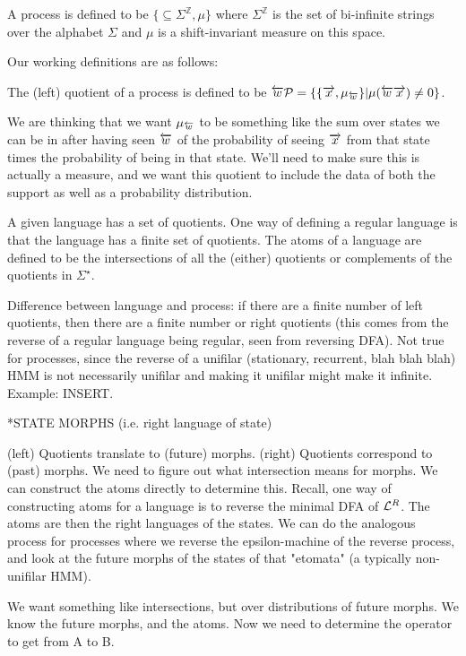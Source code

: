 \documentclass[prl,twocolumn,superscriptaddress,preprintnumbers,floatfix]{revtex4-1}
\begin{document}
A process \Process is defined to be $\{\subseteq \Sigma^{\mathbb{Z}}, \mu\}$ where $\Sigma^{\mathbb{Z}}$ is the set of bi-infinite strings over the alphabet $\Sigma$ and $\mu$ is a shift-invariant measure on this space.  

Our working definitions are as follows: 

The (left) quotient of a process \Process is defined to be $\overleftarrow{w} \mathcal{P} 
= \{ \{ \overrightarrow{x}, \mu_{\overleftarrow{w}} \} | \mu(\overleftarrow{w} \overrightarrow{x}) \neq 0 \}$. 

We are thinking that we want $\mu_{\overleftarrow{w}}$ to be something like the sum over states we can be in after having seen $\overleftarrow{w}$ of the probability of seeing $\overrightarrow{x}$ from that state times the probability of being in that state.  We'll need to make sure this is actually a measure, and we want this quotient to include the data of both the support as well as a probability distribution.  

A given language \Language has a set of quotients.  One way of defining a regular language is that the language has a finite set of quotients.  The atoms of a language are defined to be the intersections of all the (either) quotients or complements of the quotients in $\Sigma^{\star}$.  

Difference between language and process: if there are a finite number of left quotients, then there are a finite number or right quotients (this comes from the reverse of a regular language being regular, seen from reversing DFA).  Not true for processes, since the reverse of a unifilar (stationary, recurrent, blah blah blah) HMM is not necessarily unifilar and making it unifilar might make it infinite. Example: INSERT.  

*STATE MORPHS (i.e. right language of state)

(left) Quotients translate to (future) morphs. (right) Quotients correspond to (past) morphs.  We need to figure out what intersection means for morphs.  We can construct the atoms directly to determine this.  Recall, one way of constructing atoms for a language \Language is to reverse the minimal DFA of $\mathcal{L}^{R}$.  The atoms are then the right languages of the states. We can do the analogous process for processes where we reverse the epsilon-machine of the reverse process, and look at the future morphs of the states of that "etomata" (a typically non-unifilar HMM).

We want something like intersections, but over distributions of future morphs.  We know the future morphs, and the atoms.  Now we need to determine the operator to get from A to B.  
\end{document}
